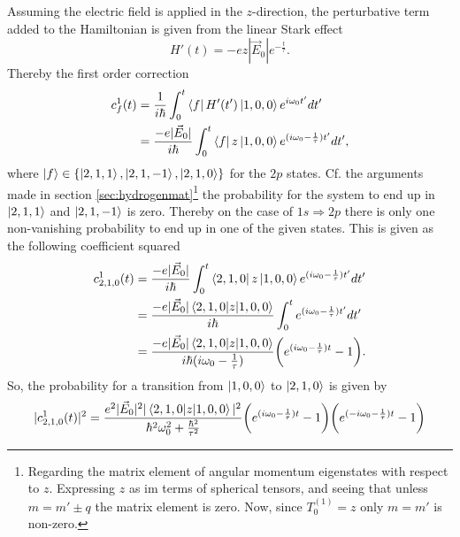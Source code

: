 \begin{example}
	Assuming the electric field is applied in the $z$-direction, the perturbative term added to the Hamiltonian is given from the linear Stark effect
	\begin{equation}
		H'(t)=-ez|\vec{E}_0|e^{-\frac{t}{\tau}}.
	\end{equation} 
	Thereby the first order correction
	\begin{equation}
		\begin{split}
			c^1_{f}(t)&=\frac{1}{i\hbar}\int_{0}^{t}\bra{f}H'(t')\ket{1,0,0}e^{i\omega_{0}t'}dt'\\
			&=\frac{-e|\vec{E}_0|}{i\hbar}\int_{0}^{t}\bra{f}z\ket{1,0,0}e^{(i\omega_{0}-\frac{1}{\tau})t'}dt',\\
		\end{split}
	\end{equation} 
	where $\ket{f}\in\{\ket{2,1,1}, \ket{2,1,-1}, \ket{2,1,0}\}$ for the $2p$ states. Cf. the arguments made in section \ref{sec:hydrogenmat}\footnote{Regarding the matrix element of angular momentum eigenstates with respect to $z$. Expressing $z$ as im terms of spherical tensors, and seeing that unless $m=m'\pm q$ the matrix element is zero. Now, since $T_{0}^{(1)}=z$ only $m=m'$ is non-zero.} the probability for the system to end up in $\ket{2,1,1}$ and $\ket{2,1,-1}$ is zero. Thereby on the case of $1s\Rightarrow 2p$ there is only one non-vanishing probability to end up in one of the given states. This is given as the following coefficient squared
	\begin{equation}
		\begin{split}
			c^1_{2,1,0}(t)&=\frac{-e|\vec{E}_0|}{i\hbar}\int_{0}^{t}\bra{2,1,0}z\ket{1,0,0}e^{(i\omega_{0}-\frac{1}{\tau})t'}dt'\\
			&=\frac{-e|\vec{E}_0|\braket{2,1,0|z|1,0,0}}{i\hbar}\int_{0}^{t}e^{(i\omega_{0}-\frac{1}{\tau})t'}dt'\\
			&=\frac{-e|\vec{E}_0|\braket{2,1,0|z|1,0,0}}{i\hbar(i\omega_{0}-\frac{1}{\tau})}\bigg(e^{(i\omega_{0}-\frac{1}{\tau})t}-1\bigg).
		\end{split}
	\end{equation} 
	So, the probability for a transition from $\ket{1,0,0}$ to $\ket{2,1,0}$ is given by
	\begin{equation}
		\begin{split}
			|c^1_{2,1,0}(t)|^2&=\frac{e^2|\vec{E}_0|^2|\braket{2,1,0|z|1,0,0}|^2}{\hbar^2\omega_{0}^2+\frac{\hbar^2}{\tau^2}}\bigg(e^{(i\omega_{0}-\frac{1}{\tau})t}-1\bigg)\bigg(e^{(-i\omega_{0}-\frac{1}{\tau})t}-1\bigg)\\

\end{split}
\end{equation}
\end{example}
